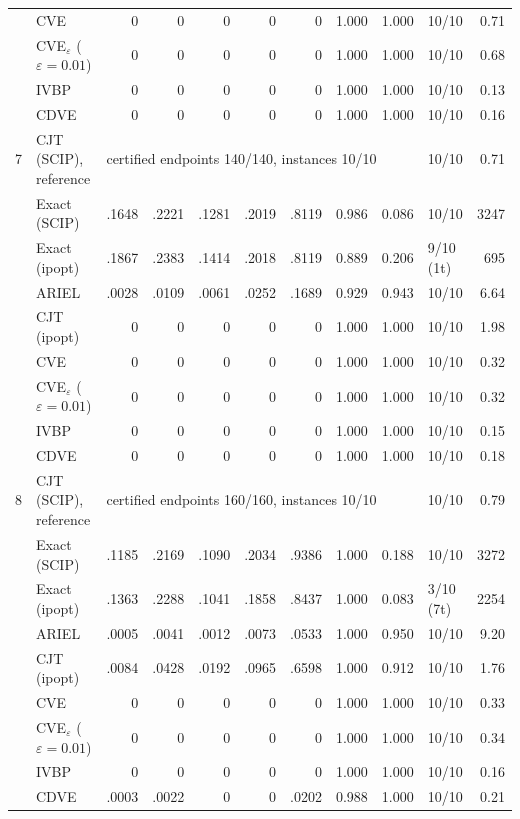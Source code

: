 \begin{table}[htbp]
\begin{tabular}{rlrrrrrrrlr}
 & CVE & 0 & 0 & 0 & 0 & 0 & 1.000 & 1.000 & 10/10 & 0.71 \\
 & CVE$_\varepsilon$ ($\varepsilon{=}0.01$) & 0 & 0 & 0 & 0 & 0 & 1.000 & 1.000 & 10/10 & 0.68 \\
 & IVBP & 0 & 0 & 0 & 0 & 0 & 1.000 & 1.000 & 10/10 & 0.13 \\
 & CDVE & 0 & 0 & 0 & 0 & 0 & 1.000 & 1.000 & 10/10 & 0.16 \\
\midrule
7 & CJT (SCIP), reference & \multicolumn{7}{l}{certified endpoints 140/140, instances 10/10} & 10/10 & 0.71 \\
 & Exact (SCIP) & .1648 & .2221 & .1281 & .2019 & .8119 & 0.986 & 0.086 & 10/10 & 3247 \\
 & Exact (ipopt) & .1867 & .2383 & .1414 & .2018 & .8119 & 0.889 & 0.206 & 9/10 (1t) & 695 \\
 & ARIEL & .0028 & .0109 & .0061 & .0252 & .1689 & 0.929 & 0.943 & 10/10 & 6.64 \\
 & CJT (ipopt) & 0 & 0 & 0 & 0 & 0 & 1.000 & 1.000 & 10/10 & 1.98 \\
 & CVE & 0 & 0 & 0 & 0 & 0 & 1.000 & 1.000 & 10/10 & 0.32 \\
 & CVE$_\varepsilon$ ($\varepsilon{=}0.01$) & 0 & 0 & 0 & 0 & 0 & 1.000 & 1.000 & 10/10 & 0.32 \\
 & IVBP & 0 & 0 & 0 & 0 & 0 & 1.000 & 1.000 & 10/10 & 0.15 \\
 & CDVE & 0 & 0 & 0 & 0 & 0 & 1.000 & 1.000 & 10/10 & 0.18 \\
\midrule
8 & CJT (SCIP), reference & \multicolumn{7}{l}{certified endpoints 160/160, instances 10/10} & 10/10 & 0.79 \\
 & Exact (SCIP) & .1185 & .2169 & .1090 & .2034 & .9386 & 1.000 & 0.188 & 10/10 & 3272 \\
 & Exact (ipopt) & .1363 & .2288 & .1041 & .1858 & .8437 & 1.000 & 0.083 & 3/10 (7t) & 2254 \\
 & ARIEL & .0005 & .0041 & .0012 & .0073 & .0533 & 1.000 & 0.950 & 10/10 & 9.20 \\
 & CJT (ipopt) & .0084 & .0428 & .0192 & .0965 & .6598 & 1.000 & 0.912 & 10/10 & 1.76 \\
 & CVE & 0 & 0 & 0 & 0 & 0 & 1.000 & 1.000 & 10/10 & 0.33 \\
 & CVE$_\varepsilon$ ($\varepsilon{=}0.01$) & 0 & 0 & 0 & 0 & 0 & 1.000 & 1.000 & 10/10 & 0.34 \\
 & IVBP & 0 & 0 & 0 & 0 & 0 & 1.000 & 1.000 & 10/10 & 0.16 \\
 & CDVE & .0003 & .0022 & 0 & 0 & .0202 & 0.988 & 1.000 & 10/10 & 0.21 \\

\end{tabular}
\end{table}
